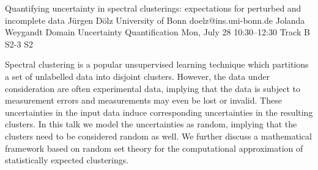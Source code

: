 \begin{talk}
\end{talk}

\begin{talk}
  {Quantifying uncertainty in spectral clusterings: expectations for perturbed and incomplete data}%
  {J\"urgen D\"olz}%
  {University of Bonn}%
  {doelz@ins.uni-bonn.de}%
  {Jolanda Weygandt}%
  {Domain Uncertainty Quantification}%
  {Mon, July 28 10:30–12:30 Track B}%
  {S2-3}%
  {S2}%
				
			
Spectral clustering is a popular unsupervised learning technique which partitions a set of unlabelled data into disjoint clusters. However, the data under consideration are often experimental data, implying that the data is subject to measurement errors and measurements may even be lost or invalid. These uncertainties in the input data induce corresponding uncertainties in the resulting clusters. In this talk we model the uncertainties as random, implying that the clusters need to be considered random as well. We further discuss a mathematical framework based on random set theory for the computational approximation of statistically expected clusterings.
\end{talk}

